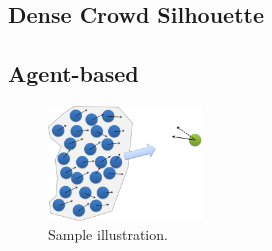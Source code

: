 \subsection{Dense Crowd Silhouette}

\subsection{Agent-based}
\begin{figure}
\centering
  \includegraphics[width=1.6in]{images/agent_group_collision}
  \caption{Sample illustration.}
\end{figure}

%




